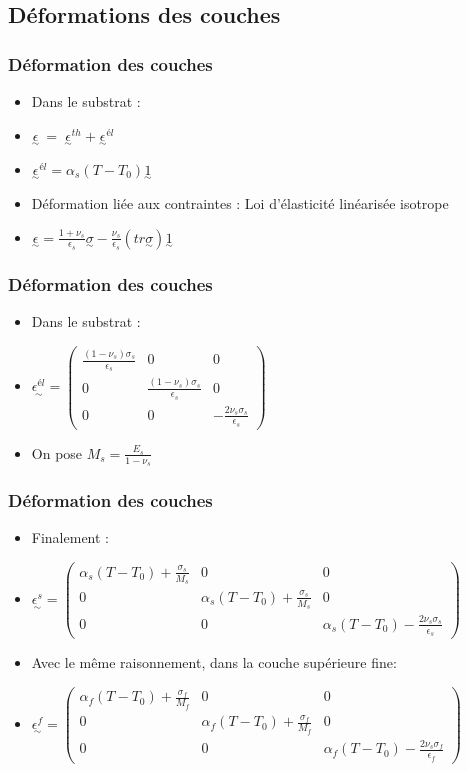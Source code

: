 \subsection{Déformations des couches} 
\begin{frame}
    \frametitle{Déformation des couches} 
    \begin{itemize}
        \item Dans le substrat :
        \item $\underset{\sim}{\epsilon}~=~\underset{\sim}{\epsilon}^{th} + \underset{\sim}{\epsilon}^{él}$
        \item $\underset{\sim}{\epsilon}^{él}= \alpha_s(T-T_0)\underset{\sim}{1}$
        \item Déformation liée aux contraintes : Loi d'élasticité linéarisée isotrope
        \item $\underset{\sim}{\epsilon}=\frac{1+\nu_s}{\epsilon_s}\underset{\sim}{\sigma}-\frac{\nu_s}{\epsilon_s}(tr\underset{\sim}{\sigma})\underset{\sim}{1}$
    \end{itemize}
\end{frame}   

\begin{frame}
    \frametitle{Déformation des couches} 
    \begin{itemize}
        \item Dans le substrat :
        \item $\underset{\sim}{\epsilon^{él}}=\begin{pmatrix}\frac{(1-\nu_s)\sigma_s}{\epsilon_s}&0&0\\0&\frac{(1-\nu_s)\sigma_s}{\epsilon_s}&0\\0&0&-\frac{2\nu_s\sigma_s}{\epsilon_s}\end{pmatrix}$
        \item On pose $M_s = \frac{E_s}{1-\nu_s}$
    \end{itemize}
\end{frame}  

\begin{frame}
    \frametitle{Déformation des couches} 
    \begin{itemize}
        \item Finalement :
        \item $\underset{\sim}{\epsilon^s}=\begin{pmatrix}\alpha_s(T-T_0)+\frac{\sigma_s}{M_s}&0&0\\0&\alpha_s(T-T_0)+\frac{\sigma_s}{M_s}&0\\0&0&\alpha_s(T-T_0)-\frac{2\nu_s\sigma_s}{\epsilon_s}\end{pmatrix}$
        \item Avec le même raisonnement, dans la couche supérieure fine:
        \item $\underset{\sim}{\epsilon^f}=\begin{pmatrix}\alpha_f(T-T_0)+\frac{\sigma_f}{M_f}&0&0\\0&\alpha_f(T-T_0)+\frac{\sigma_f}{M_f}&0\\0&0&\alpha_f(T-T_0)-\frac{2\nu_s\sigma_f}{\epsilon_f}\end{pmatrix}$
    \end{itemize} 
\end{frame} 

